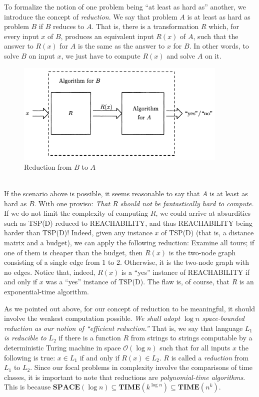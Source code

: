 \documentclass[12pt]{article}
\begin{document}
To formalize the notion of one problem being ``at least as hard as'' another, we introduce the concept of \emph{reduction}. We say that problem $A$ is at least as hard as problem $B$ if $B$ reduces to $A$. That is, there is a transformation $R$ which, for every input $x$ of $B$, produces an equivalent input $R(x)$ of $A$, such that the answer to $R(x)$ for $A$ is the same as the answer to $x$ for $B$. In other words, to solve $B$ on input $x$, we just have to compute $R(x)$ and solve $A$ on it.
\begin{figure}[ht]
  \centering
  \includegraphics[width=0.9\textwidth]{img/reduction.png}
  \caption{Reduction from $B$ to $A$}
\end{figure}
\\
If the scenario above is possible, it seems reasonable to say that $A$ is at least as hard as $B$. With one proviso: \textit{That $R$ should not be fantastically hard to compute.} If we do not limit the complexity of computing $R$, we could arrive at absurdities such as \textsc{TSP(D)} reduced to \textsc{REACHABILITY}, and thus \textsc{REACHABILITY} being harder than \textsc{TSP(D)}! Indeed, given any instance $x$ of \textsc{TSP(D)} (that is, a distance matrix and a budget), we can apply the following reduction: Examine all tours; if one of them is cheaper than the budget, then $R(x)$ is the two-node graph consisting of a single edge from 1 to 2. Otherwise, it is the two-node graph with no edges. Notice that, indeed, $R(x)$ is a ``yes'' instance of \textsc{REACHABILITY} if and only if $x$ was a ``yes'' instance of \textsc{TSP(D)}. The flaw is, of course, that $R$ is an exponential-time algorithm.
\begin{defbox}[Reduction]
  As we pointed out above, for our concept of reduction to be meaningful, it should involve the weakest computation possible. \emph{We shall adopt $\log n$ space-bounded reduction as our notion of ``efficient reduction.''} That is, we say that language $L_1$ \emph{is reducible to} $L_2$ if there is a function $R$ from strings to strings computable by a deterministic Turing machine in space $\mathcal{O}(\log n)$ such that for all inputs $x$ the following is true: $x \in L_1$ if and only if $R(x) \in L_2$. $R$ is called a \emph{reduction} from $L_1$ to $L_2$. Since our focal problems in complexity involve the comparisons of time classes, it is important to note that reductions are \emph{polynomial-time algorithms}.
  This is because $\textbf{SPACE}(\log n)\subseteq\textbf{TIME}(k^{\log n})\subseteq\textbf{TIME}(n^k)$.
\end{defbox}
\end{document}
